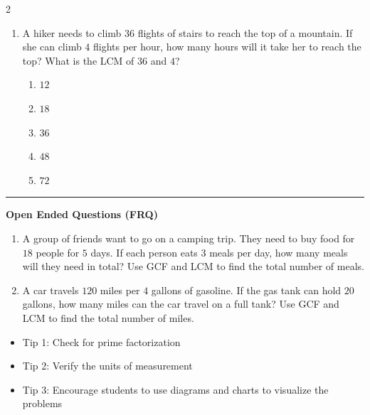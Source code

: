 \documentclass[10pt]{article}
\begin{document}
\begin{multicols}{2}
\begin{enumerate}[label=\textbf{Q\arabic*.}, leftmargin=*, itemsep=6pt, parsep=0pt]
  \item \small A hiker needs to climb $36$ flights of stairs to reach the top of a mountain. If she can climb $4$ flights per hour, how many hours will it take her to reach the top? What is the LCM of $36$ and $4$?
  \begin{enumerate}[label=(\Alph*), leftmargin=0.6cm, nosep, itemsep=2pt]
    \item $12$
    \item $18$
    \item $36$
    \item $48$
    \item $72$
  \end{enumerate}

\end{enumerate}
\end{multicols}

\vspace{-0.2cm}
\hrule
\vspace{0.2cm}
\textbf{\small Open Ended Questions (FRQ)}
\begin{enumerate}[label=\textbf{Q\arabic*.}, start=9, itemsep=5pt, topsep=0pt]

  \item \small A group of friends want to go on a camping trip. They need to buy food for $18$ people for $5$ days. If each person eats $3$ meals per day, how many meals will they need in total? Use GCF and LCM to find the total number of meals. \vspace{2cm}

  \item \small A car travels $120$ miles per $4$ gallons of gasoline. If the gas tank can hold $20$ gallons, how many miles can the car travel on a full tank? Use GCF and LCM to find the total number of miles. \vspace{2cm}

\end{enumerate}

\vfill

\begin{tcolorbox}[colback=blue!5, colframe=mainblue!50, title=\small \textbf{Chef's Tips}, fonttitle=\bfseries, bottom=1mm]
\begin{itemize}[noitemsep, topsep=2pt, leftmargin=0.5cm]
  \item \scriptsize Tip 1: Check for prime factorization\item \scriptsize Tip 2: Verify the units of measurement\item \scriptsize Tip 3: Encourage students to use diagrams and charts to visualize the problems
\end{itemize}
\end{tcolorbox}
\end{document}
